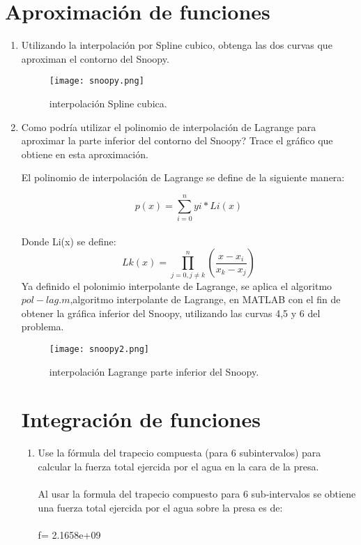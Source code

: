 \documentclass{udpreport}
\begin{document}
\chapter{Aproximación de funciones} 
\begin{enumerate}
    
\vspace{0.9cm}


\item Utilizando la interpolación por Spline cubico, obtenga las dos curvas que aproximan el contorno del  Snoopy.


\begin{figure}[H]
    \centering
    \texttt{[image: snoopy.png]}
    \caption{interpolación Spline cubica.} \label{fig:interp_spline}
\end{figure}


\item Como podría utilizar el polinomio de interpolación de Lagrange para aproximar la parte inferior del contorno del Snoopy? Trace el gráfico que obtiene en esta aproximación.

El polinomio de interpolación de Lagrange se define de la siguiente manera:

 \begin{equation}
 p(x)=\sum_{i=0}^n yi*Li(x)
\end{equation}
\\ Donde Li(x) se define:
 \begin{equation}
 Lk(x)=\prod_{j=0,j\not=k}^{n}  \left( \frac{x-x_{i}}{x_{k}-x_{j}} \right)
\end{equation}
Ya definido el polonimio interpolante de Lagrange, se aplica el algoritmo $pol-lag.m$,algoritmo interpolante de Lagrange, en MATLAB con el fin de obtener la gráfica inferior del Snoopy, utilizando las curvas 4,5 y 6 del problema. 
\begin{figure}[H]
    \centering
    \texttt{[image: snoopy2.png]}
    \caption{interpolación Lagrange parte inferior del Snoopy.} \label{fig:snoopy2}
\end{figure}


  
 \chapter{Integración de funciones} 

 \begin{enumerate}
 \item Use la fórmula del trapecio compuesta (para 6 subintervalos) para calcular la fuerza total ejercida por el agua en la cara de la presa.
 \\ 
 \\
 Al usar la formula del trapecio compuesto para 6 sub-intervalos se obtiene una fuerza total ejercida por el agua sobre la presa es de:
 \\
 \\
 f= 2.1658e+09



\end{enumerate}
\end{enumerate}
\end{document}
